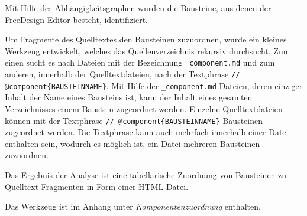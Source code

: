 Mit Hilfe der Abhängigkeitsgraphen wurden die Bausteine, aus denen der FreeDesign-Editor besteht, identifiziert. 

Um Fragmente des Quelltextes den Bausteinen zuzuordnen, wurde ein kleines Werkzeug entwickelt, welches das Quellenverzeichnis rekursiv durchsucht. Zum einen sucht es nach Dateien mit der Bezeichnung \glqq\lstinline|_component.md|\grqq{} und zum anderen, innerhalb der Quelltextdateien, nach der Textphrase \glqq\lstinline|// @component{BAUSTEINNAME}|\grqq{}. 
Mit Hilfe der \lstinline|_component.md|-Dateien, deren einziger Inhalt der Name eines Bausteins ist, kann der Inhalt eines gesamten Verzeichnisses einem Baustein zugeordnet werden. Einzelne Quelltextdateien können mit der Textphrase \glqq\lstinline|// @component{BAUSTEINNAME}|\grqq{} Bausteinen zugeordnet werden. Die Textphrase kann auch mehrfach innerhalb einer Datei enthalten sein, wodurch es möglich ist, ein Datei mehreren Bausteinen zuzuordnen. 

Das Ergebnis der Analyse ist eine tabellarische Zuordnung von Bausteinen zu Quelltext-Fragmenten in Form einer HTML-Datei. 

Das Werkzeug ist im Anhang unter \emph{Komponentenzuordnung} enthalten.